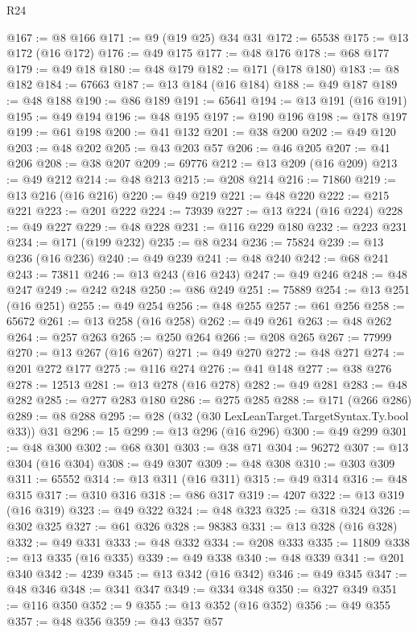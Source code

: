 \begin{lexlean}{R24}
\begin{coremodule}
@167 := @8 @166
@171 := @9 (@19 @25) @34 @31
@172 := 65538
@175 := @13 @172 (@16 @172)
@176 := @49 @175
@177 := @48 @176
@178 := @68 @177
@179 := @49 @18
@180 := @48 @179
@182 := @171 (@178 @180)
@183 := @8 @182
@184 := 67663
@187 := @13 @184 (@16 @184)
@188 := @49 @187
@189 := @48 @188
@190 := @86 @189
@191 := 65641
@194 := @13 @191 (@16 @191)
@195 := @49 @194
@196 := @48 @195
@197 := @190 @196
@198 := @178 @197
@199 := @61 @198
@200 := @41 @132
@201 := @38 @200
@202 := @49 @120
@203 := @48 @202
@205 := @43 @203 @57
@206 := @46 @205
@207 := @41 @206
@208 := @38 @207
@209 := 69776
@212 := @13 @209 (@16 @209)
@213 := @49 @212
@214 := @48 @213
@215 := @208 @214
@216 := 71860
@219 := @13 @216 (@16 @216)
@220 := @49 @219
@221 := @48 @220
@222 := @215 @221
@223 := @201 @222
@224 := 73939
@227 := @13 @224 (@16 @224)
@228 := @49 @227
@229 := @48 @228
@231 := @116 @229 @180
@232 := @223 @231
@234 := @171 (@199 @232)
@235 := @8 @234
@236 := 75824
@239 := @13 @236 (@16 @236)
@240 := @49 @239
@241 := @48 @240
@242 := @68 @241
@243 := 73811
@246 := @13 @243 (@16 @243)
@247 := @49 @246
@248 := @48 @247
@249 := @242 @248
@250 := @86 @249
@251 := 75889
@254 := @13 @251 (@16 @251)
@255 := @49 @254
@256 := @48 @255
@257 := @61 @256
@258 := 65672
@261 := @13 @258 (@16 @258)
@262 := @49 @261
@263 := @48 @262
@264 := @257 @263
@265 := @250 @264
@266 := @208 @265
@267 := 77999
@270 := @13 @267 (@16 @267)
@271 := @49 @270
@272 := @48 @271
@274 := @201 @272 @177
@275 := @116 @274
@276 := @41 @148
@277 := @38 @276
@278 := 12513
@281 := @13 @278 (@16 @278)
@282 := @49 @281
@283 := @48 @282
@285 := @277 @283 @180
@286 := @275 @285
@288 := @171 (@266 @286)
@289 := @8 @288
@295 := @28 (@32 (@30 LexLeanTarget.TargetSyntax.Ty.bool @33)) @31
@296 := 15
@299 := @13 @296 (@16 @296)
@300 := @49 @299
@301 := @48 @300
@302 := @68 @301
@303 := @38 @71
@304 := 96272
@307 := @13 @304 (@16 @304)
@308 := @49 @307
@309 := @48 @308
@310 := @303 @309
@311 := 65552
@314 := @13 @311 (@16 @311)
@315 := @49 @314
@316 := @48 @315
@317 := @310 @316
@318 := @86 @317
@319 := 4207
@322 := @13 @319 (@16 @319)
@323 := @49 @322
@324 := @48 @323
@325 := @318 @324
@326 := @302 @325
@327 := @61 @326
@328 := 98383
@331 := @13 @328 (@16 @328)
@332 := @49 @331
@333 := @48 @332
@334 := @208 @333
@335 := 11809
@338 := @13 @335 (@16 @335)
@339 := @49 @338
@340 := @48 @339
@341 := @201 @340
@342 := 4239
@345 := @13 @342 (@16 @342)
@346 := @49 @345
@347 := @48 @346
@348 := @341 @347
@349 := @334 @348
@350 := @327 @349
@351 := @116 @350
@352 := 9
@355 := @13 @352 (@16 @352)
@356 := @49 @355
@357 := @48 @356
@359 := @43 @357 @57

\end{coremodule}
\end{lexlean}
